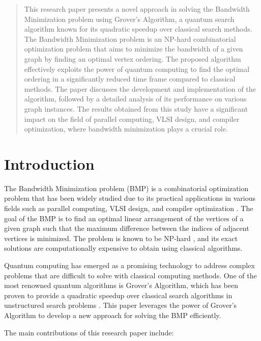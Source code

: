 \begin{abstract}
This research paper presents a novel approach in solving the Bandwidth Minimization problem using Grover's Algorithm, a quantum search algorithm known for its quadratic speedup over classical search methods. The Bandwidth Minimization problem is an NP-hard combinatorial optimization problem that aims to minimize the bandwidth of a given graph by finding an optimal vertex ordering. The proposed algorithm effectively exploits the power of quantum computing to find the optimal ordering in a significantly reduced time frame compared to classical methods. The paper discusses the development and implementation of the algorithm, followed by a detailed analysis of its performance on various graph instances. The results obtained from this study have a significant impact on the field of parallel computing, VLSI design, and compiler optimization, where bandwidth minimization plays a crucial role.

\end{abstract}

\section{Introduction}
\label{sec:introduction}

The Bandwidth Minimization problem (BMP) is a combinatorial optimization problem that has been widely studied due to its practical applications in various fields such as parallel computing, VLSI design, and compiler optimization \cite{bmp_applications}. The goal of the BMP is to find an optimal linear arrangement of the vertices of a given graph such that the maximum difference between the indices of adjacent vertices is minimized. The problem is known to be NP-hard \cite{bmp_nphard}, and its exact solutions are computationally expensive to obtain using classical algorithms.

Quantum computing has emerged as a promising technology to address complex problems that are difficult to solve with classical computing methods. One of the most renowned quantum algorithms is Grover's Algorithm, which has been proven to provide a quadratic speedup over classical search algorithms in unstructured search problems \cite{grover}. This paper leverages the power of Grover's Algorithm to develop a new approach for solving the BMP efficiently.

The main contributions of this research paper include:

